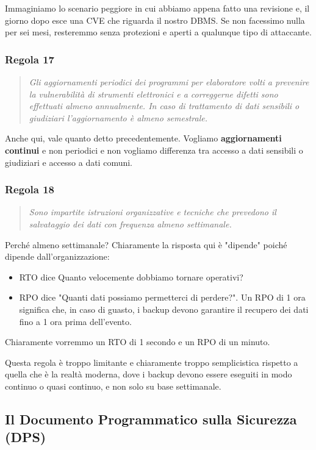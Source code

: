 Immaginiamo lo scenario peggiore in cui abbiamo appena fatto una revisione e, il giorno dopo esce una CVE che riguarda il nostro DBMS. Se non facessimo nulla per sei mesi, resteremmo senza protezioni e aperti a qualunque tipo di attaccante.

\subsubsection*{Regola 17}
\begin{quote}
    \textit{Gli aggiornamenti periodici dei programmi per elaboratore volti a prevenire la vulnerabilità di strumenti elettronici e a correggerne difetti sono effettuati almeno annualmente. In caso di trattamento di dati sensibili o giudiziari l'aggiornamento è almeno semestrale.}
\end{quote}

Anche qui, vale quanto detto precedentemente. Vogliamo \textbf{aggiornamenti continui} e non periodici e non vogliamo differenza tra accesso a dati sensibili o giudiziari e accesso a dati comuni.

\subsubsection*{Regola 18}
\begin{quote}
    \textit{Sono impartite istruzioni organizzative e tecniche che prevedono il salvataggio dei dati con frequenza almeno settimanale.}
\end{quote}
Perché almeno settimanale?  Chiaramente la risposta qui è "dipende" poiché dipende dall'organizzazione:
\begin{itemize}
    \item RTO dice Quanto velocemente dobbiamo tornare operativi?
    \item RPO dice "Quanti dati possiamo permetterci di perdere?". Un RPO di 1 ora significa che, in caso di guasto, i backup devono garantire il recupero dei dati fino a 1 ora prima dell'evento.
\end{itemize}
Chiaramente vorremmo un RTO di 1 secondo e un RPO di un minuto.

Questa regola è troppo limitante e chiaramente troppo semplicistica rispetto a quella che è la realtà moderna, dove i backup devono essere eseguiti in modo continuo o quasi continuo, e non solo su base settimanale.

\subsection{Il Documento Programmatico sulla Sicurezza (DPS)}

